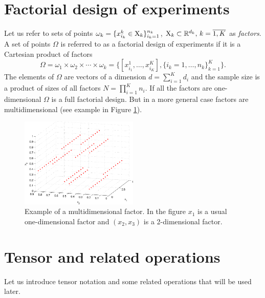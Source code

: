 

\section{Factorial design of experiments}
Let us refer to sets of points
${\omega_k = \{ x_{i_k}^k \in {\rm X}_k \}_{i_k = 1}^{n_k}}$,
${\rm X}_k \subset \mathbb{R}^{d_k}, \, k = \overline{1, K}$ as {\em factors}.
A set of points $\Omega$ is referred to as a factorial design of experiments
if it is a Cartesian product of factors
\begin{equation}
  \label{eq:factorial_design}
    \Omega = \omega_1 \times \omega_2 \times \cdots \times \omega_k =
    \{ [x_{i_1}^1, \ldots, x_{i_K}^K], \{ i_k = 1, \ldots, n_k\}_{k = 1}^K \}.
\end{equation}
The elements of $\Omega$ are vectors of a dimension $d = \sum_{i = 1}^K d_i$ and
the sample size is a product of sizes of all factors $N = \prod_{i = 1}^K n_i$.
If all the factors are one-dimensional $\Omega$ is a full factorial design.
But in a more general case factors are multidimensional (see example in Figure \ref{fig:multidim_factor}).

\begin{figure}
  \centering
  \includegraphics[width=0.5\textwidth]{figures/gp_on_grid/multidim_factor.pdf}
  \caption{Example of a multidimensional factor. In the figure $x_1$ is a usual one-dimensional factor
  and $(x_2, x_3)$ is a 2-dimensional factor.}
  \label{fig:multidim_factor}
\end{figure}


\section{Tensor and related operations}
Let us introduce tensor notation and some related operations that will be used
later.

